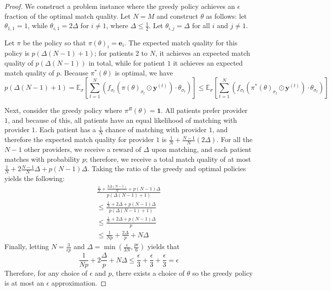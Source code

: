 \thmgreedy* 
\begin{proof}
    We construct a problem instance where the greedy policy achieves an $\epsilon$ fraction of the optimal match quality. 
    Let $N=M$ and construct $\theta$ as follows: let $\theta_{1,1} = 1$, while $\theta_{i,1} = 2 \Delta$ for $i \neq 1$, where $\Delta \leq \frac{1}{2}$. Let $\theta_{i,j} = \Delta$ for all $i$ and $j \neq 1$. 

    Let $\pi$ be the policy so that $\pi(\theta)_{i} = \mathbf{e}_{i}$. 
    The expected match quality for this policy is $p(\Delta (N-1) + 1)$; for patients 2 to $N$, it achieves an expected match quality of $p(\Delta (N-1))$ in total, while for patient $1$ it achieves an expected match quality of $p$. 
    Because $\pi^{*}(\theta)$ is optimal, we have  
    \begin{equation}
        p(\Delta (N-1) + 1) = \mathbb{E}_{\sigma}[\sum_{t=1}^{N}  (f_{\sigma_{t}}\left(\pi(\theta)_{\sigma_{t}} \odot \mathbf{y}^{(t)}\right) \cdot \theta_{\sigma_{t}})] \leq \mathbb{E}_{\sigma}[\sum_{t=1}^{N}  (f_{\sigma_{t}}\left(\pi^{*}(\theta)_{\sigma_{t}} \odot \mathbf{y}^{(t)}\right) \cdot \theta_{\sigma_{t}})]
    \end{equation}

    Next, consider the greedy policy where $\pi^{R}(\theta) = \mathbf{1}$.
    All patients prefer provider $1$, and because of this, all patients have an equal likelihood of matching with provider $1$. 
    Each patient has a $\frac{1}{N}$ chance of matching with provider $1$, and therefore the expected match quality for provider $1$ is $\frac{1}{N} + \frac{N-1}{N} (2 \Delta)$. 
    For all the $N-1$ other providers, we receive a reward of $\Delta$ upon matching, and each patient matches with probability $p$; therefore, we receive a total match quality of at most $\frac{1}{N} + 2  \frac{N-1}{N} \Delta + p(N-1) \Delta$. 
    Taking the ratio of the greedy and optimal policies yields the following: 
    \begin{align*}
        \frac{\frac{1}{N} + \frac{2\Delta(N-1)}{N} + p(N-1) \Delta}{p (\Delta (N-1) + 1)} \\
         \leq \frac{\frac{1}{N} + 2\Delta + p(N-1) \Delta}{p(\Delta (N-1) + 1)} \\ \leq \frac{\frac{1}{N} + 2\Delta + p(N-1) \Delta}{p} \\ 
         \leq \frac{1}{Np} + \frac{2\Delta}{p} + N \Delta 
    \end{align*}
    Finally, letting $N=\frac{3}{\epsilon p}$ and $\Delta = \min(\frac{\epsilon}{3N},\frac{p\epsilon}{6})$ yields that 
    \begin{equation}
       \frac{1}{Np} + 2\frac{\Delta}{p} + N \Delta \leq \frac{\epsilon}{3} + \frac{\epsilon}{3} + \frac{\epsilon}{3} = \epsilon   
    \end{equation}
    Therefore, for any choice of $\epsilon$ and $p$, there exists a choice of  $\theta$ so the greedy policy is at most an $\epsilon$ approximation. 
\end{proof}

